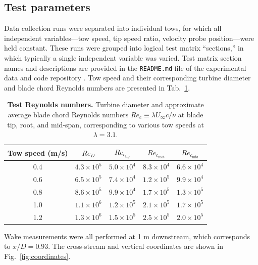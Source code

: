 \documentclass[10pt,letterpaper]{article}
\begin{document}
\subsection*{Test parameters}

Data collection runs were separated into individual tows, for which all
independent variables---tow speed, tip speed ratio, velocity probe
position---were held constant. These runs were grouped into logical test matrix
``sections,'' in which typically a single independent variable was varied. Test
matrix section names and descriptions are provided in the \texttt{README.md}
file of the experimental data and code repository \cite{Bachant2015-RM2-data}.
Tow speed and their corresponding turbine diameter and blade chord Reynolds
numbers are presented in Tab.~\ref{tab:re}.

\begin{table}
\centering
\begin{tabular}{c|c|c|c|c}
Tow speed (m/s) & $Re_D$ & $Re_{c_\mathrm{tip}}$ & $Re_{c_\mathrm{root}}$ & $Re_{c_\mathrm{mid}}$\\
\hline
0.4 & $4.3 \times 10^5$ & $5.0 \times 10^4$ & $8.3 \times 10^4$ & $6.6 \times 10^4$ \\
0.6 & $6.5 \times 10^5$ & $7.4 \times 10^4$ & $1.2 \times 10^5$ & $9.9 \times 10^4$ \\
0.8 & $8.6 \times 10^5$ & $9.9 \times 10^4$ & $1.7 \times 10^5$ & $1.3 \times 10^5$ \\
1.0 & $1.1 \times 10^6$ & $1.2 \times 10^5$ & $2.1 \times 10^5$ & $1.7 \times 10^5$ \\
1.2 & $1.3 \times 10^6$ & $1.5 \times 10^5$ & $2.5 \times 10^5$ & $2.0 \times 10^5$ \\
\end{tabular}

\caption{{\bf Test Reynolds numbers.} Turbine diameter and approximate average
blade chord Reynolds numbers $Re_c \equiv \lambda U_\infty c / \nu$ at blade
tip, root, and mid-span, corresponding to various tow speeds at $\lambda=3.1$.}

\label{tab:re}
\end{table}

Wake measurements were all performed at 1 m downstream, which corresponds to
$x/D = 0.93$. The cross-stream and vertical coordinates are shown in
Fig.~\ref{fig:coordinates}.
\end{document}
